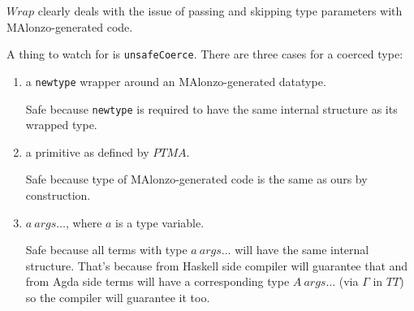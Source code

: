 \(Wrap\) clearly deals with the issue of passing and skipping type parameters with
MAlonzo-generated code.

A thing to watch for is \texttt{unsafeCoerce}.
There are three cases for a coerced type:
\begin{enumerate}
\item a \texttt{newtype} wrapper around an MAlonzo-generated datatype.

   Safe because \texttt{newtype} is required to have the same
   internal structure as its wrapped type.
\item a primitive as defined by \(PTMA\).

   Safe because type of MAlonzo-generated code is the same as ours by construction.
\item \(a\ args\ldots\), where \(a\) is a type variable.

   Safe because all terms with type \(a\ args\ldots\) will have the same internal
   structure. That's because from Haskell side compiler will guarantee that and
   from Agda side terms will have a corresponding type \(A\ args\ldots\) (via \(\Gamma\) in \(TT\))
   so the compiler will guarantee it too.
\end{enumerate}
